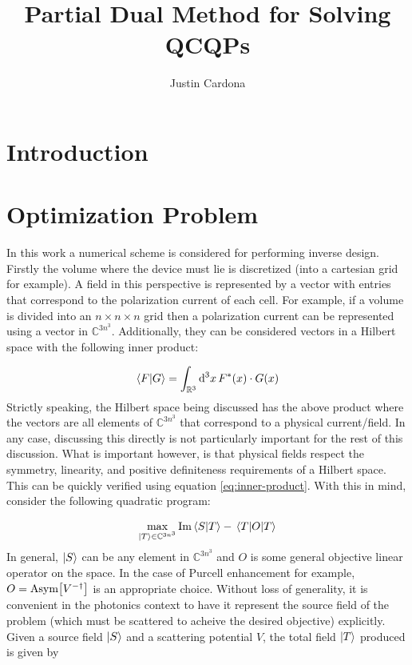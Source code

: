 \documentclass[reprint]{revtex4-2}
\begin{document}
\title{Partial Dual Method for Solving QCQPs}
\author{Justin Cardona}
\begin{abstract}
\end{abstract}
\maketitle


\section{Introduction}
\label{sec:introduction}

\section{Optimization Problem}
\label{sec:optimization}
In this work a numerical scheme is considered for performing inverse design. Firstly the volume where the device must lie is discretized (into a cartesian grid for example). A field in this perspective is represented by a vector with entries that correspond to the polarization current of each cell. For example, if a volume is divided into an $n\times n\times n$ grid then a polarization current can be represented using a vector in $\mathbb{C}^{3n^3}$. Additionally, they can be considered vectors in a Hilbert space with the following inner product:

\begin{align}
	\braket{F}{G} = \int_{\mathbb{R}^3} \dd[3]{x} F^*(x)\cdot G(x)
	\label{eq:inner-product}
\end{align}
Strictly speaking, the Hilbert space being discussed has the above product where the vectors are all elements of $\mathbb{C}^{3n^3}$ that correspond to a physical current/field. In any case, discussing this directly is not particularly important for the rest of this discussion. What is important however, is that physical fields respect the symmetry, linearity, and positive definiteness requirements of a Hilbert space. This can be quickly verified using equation \ref{eq:inner-product}. With this in mind, consider the following quadratic program:

\begin{align}
	\max_{\ket{T}\in\mathbb{C}^{3n^3}} \Im\braket{S}{T} - \ev{O}{T}
\end{align}
In general, $\ket{S}$ can be any element in $\mathbb{C}^{3n^3}$ and $O$ is some general objective linear operator on the space. In the case of Purcell enhancement for example, $O=\text{Asym}\mqty[V^{-\dagger}]$ is an appropriate choice. Without loss of generality, it is convenient in the photonics context to have it represent the source field of the problem (which must be scattered to acheive the desired objective) explicitly. Given a source field $\ket{S}$ and a scattering potential $V$, the total field $\ket{T}$ produced is given by
\end{document}
